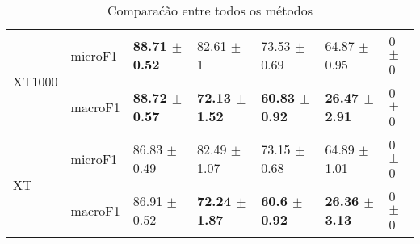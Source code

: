 \documentclass[]{article}
\begin{document}
\begin{table}[ht]
\begin{tabular}{lllllll}
  \multirow{2}{*}{XT1000} & microF1 & \bf{88.71 $\pm$  0.52} & 82.61 $\pm$  1 & 73.53 $\pm$  0.69 & 64.87 $\pm$  0.95 & 0 $\pm$  0 \\ 
   & macroF1 & \bf{88.72 $\pm$  0.57} & \bf{72.13 $\pm$  1.52} & \bf{60.83 $\pm$  0.92} & \bf{26.47 $\pm$  2.91} & 0 $\pm$  0 \\ 
  \multirow{2}{*}{XT} & microF1 & 86.83 $\pm$  0.49 & 82.49 $\pm$  1.07 & 73.15 $\pm$  0.68 & 64.89 $\pm$  1.01 & 0 $\pm$  0 \\ 
   & macroF1 & 86.91 $\pm$  0.52 & \bf{72.24 $\pm$  1.87} & \bf{60.6 $\pm$  0.92} & \bf{26.36 $\pm$  3.13} & 0 $\pm$  0 \\ 
   \hline
\end{tabular}
\caption{Comparaćão entre todos os métodos} 
\end{table}
\end{document}
